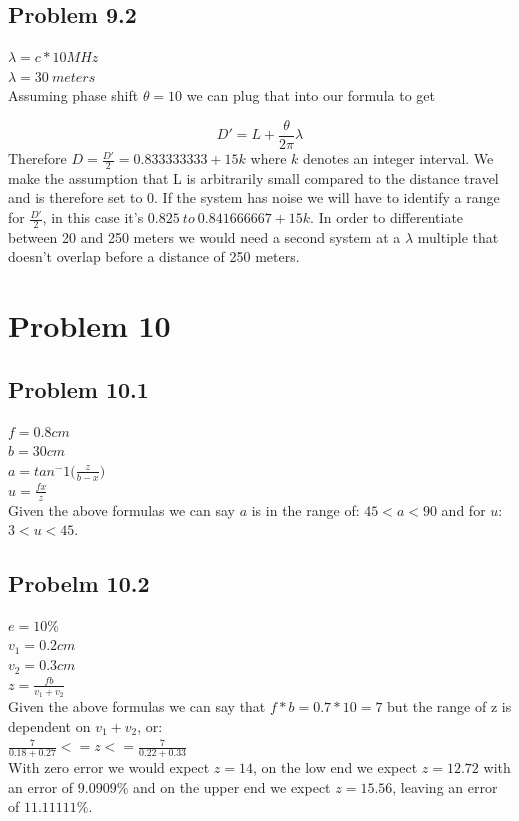 \documentclass{article}
\begin{document}
\newpage
\subsection{Problem 9.2}
\noindent $\lambda = c * 10 MHz$\\
$\lambda = 30\ meters$\\


Assuming phase shift $\theta = 10$ we can plug that into our formula to get

$$D' = L + \frac{\theta}{2\pi}\lambda$$
Therefore $D = \frac{D'}{2} = 0.833333333 + 15k$ where $k$ denotes an integer 
interval. We make the assumption that L is arbitrarily small compared to the 
distance travel and is therefore set to $0$. If the system has noise we will 
have to identify a range for $\frac{D'}{2}$, in this case it's $0.825\ to\ 
0.841666667 + 15k$. In order to differentiate between 20 and 250 meters we would 
need a second system at a $\lambda$ multiple that doesn't overlap before a 
distance of 250 meters.

\section{\textbf{Problem 10}}
\subsection{Problem 10.1}
\noindent$f = 0.8cm$\\
$b = 30cm$\\
$a = tan^-1 \big(\frac{z}{b-x}\big)$\\
$u = \frac{fx}{z}$\\

\noindent Given the above formulas we can say $a$ is in the range of: 
$45 < a < 90$ and for $u$: $3 < u < 45$.

\subsection{Probelm 10.2}
\noindent$e = 10\%$\\
$v_1 = 0.2cm$\\
$v_2 = 0.3cm$\\
$z = \frac{fb}{v_1 + v_2}$\\

\noindent Given the above formulas we can say that $f * b = 0.7 * 10 = 7$ but 
the range of z is dependent on $v_1 + v_2$, or:\\
$\frac{7}{0.18 + 0.27} <= z <= \frac{7}{0.22 + 0.33}$\\

\noindent With zero error we would expect $z = 14$, on the low end we expect 
$z = 12.72$ with an error of $9.0909\%$ and on the upper end we expect 
$z = 15.56$, leaving an error of $11.11111\%$.
\end{document}
